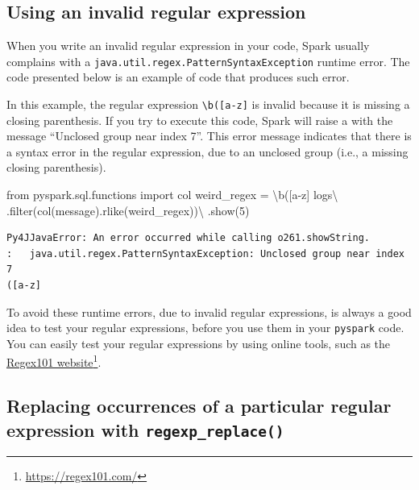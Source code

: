 \documentclass[
  11pt,
  letterpaper,
  DIV=11,
  numbers=noendperiod]{scrreprt}
\newenvironment{Shaded}{\begin{snugshade}}{\end{snugshade}}
\newcommand{\BuiltInTok}[1]{\textcolor[rgb]{0.00,0.23,0.31}{#1}}
\newcommand{\CharTok}[1]{\textcolor[rgb]{0.13,0.47,0.30}{#1}}
\newcommand{\DecValTok}[1]{\textcolor[rgb]{0.68,0.00,0.00}{#1}}
\newcommand{\ImportTok}[1]{\textcolor[rgb]{0.00,0.46,0.62}{#1}}
\newcommand{\NormalTok}[1]{\textcolor[rgb]{0.00,0.23,0.31}{#1}}
\newcommand{\OperatorTok}[1]{\textcolor[rgb]{0.37,0.37,0.37}{#1}}
\newcommand{\StringTok}[1]{\textcolor[rgb]{0.13,0.47,0.30}{#1}}
\begin{document}
\hypertarget{using-an-invalid-regular-expression}{%
\subsection{Using an invalid regular
expression}\label{using-an-invalid-regular-expression}}

When you write an invalid regular expression in your code, Spark usually
complains with a \texttt{java.util.regex.PatternSyntaxException} runtime
error. The code presented below is an example of code that produces such
error.

In this example, the regular expression
\texttt{\textbackslash{}b({[}a-z{]}} is invalid because it is missing a
closing parenthesis. If you try to execute this code, Spark will raise a
with the message ``Unclosed group near index 7''. This error message
indicates that there is a syntax error in the regular expression, due to
an unclosed group (i.e., a missing closing parenthesis).

\begin{Shaded}
\begin{Highlighting}[]
\ImportTok{from}\NormalTok{ pyspark.sql.functions }\ImportTok{import}\NormalTok{ col}
\NormalTok{weird\_regex }\OperatorTok{=} \StringTok{\textquotesingle{}}\CharTok{\textbackslash{}b}\StringTok{([a{-}z]\textquotesingle{}}
\NormalTok{logs}\OperatorTok{\textbackslash{}}
\NormalTok{    .}\BuiltInTok{filter}\NormalTok{(col(}\StringTok{\textquotesingle{}message\textquotesingle{}}\NormalTok{).rlike(weird\_regex))}\OperatorTok{\textbackslash{}}
\NormalTok{    .show(}\DecValTok{5}\NormalTok{)}
\end{Highlighting}
\end{Shaded}

\begin{verbatim}
Py4JJavaError: An error occurred while calling o261.showString.
:   java.util.regex.PatternSyntaxException: Unclosed group near index 7
([a-z]
\end{verbatim}

To avoid these runtime errors, due to invalid regular expressions, is
always a good idea to test your regular expressions, before you use them
in your \texttt{pyspark} code. You can easily test your regular
expressions by using online tools, such as the
\href{https://regex101.com/}{Regex101 website}\footnote{\url{https://regex101.com/}}.

\hypertarget{sec-regexp-replace}{%
\subsection{\texorpdfstring{Replacing occurrences of a particular
regular expression with
\texttt{regexp\_replace()}}{Replacing occurrences of a particular regular expression with regexp\_replace()}}\label{sec-regexp-replace}}
\end{document}
